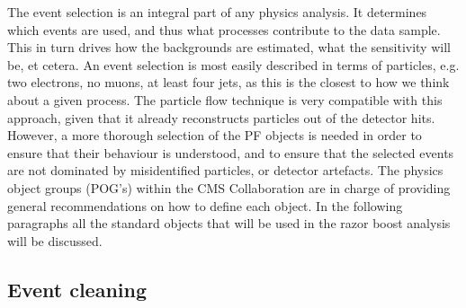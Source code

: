 The event selection is an integral part of any physics analysis. It determines which events are
used, and thus what processes contribute to the data sample. This in turn drives how the
backgrounds are estimated, what the sensitivity will be, et cetera. 
An event selection is most easily described in terms of particles, e.g. two electrons, no muons, at
least four jets, as this is the closest to how we think about a given process.  
The particle flow technique is very compatible with this approach, given that it already
reconstructs particles out of the detector hits. 
However, a more thorough selection of the PF objects is needed in order to ensure that their
behaviour is understood, and to ensure that the selected events are not dominated by
misidentified particles, or detector artefacts. 
The physics object groups (POG's) within the CMS Collaboration are in charge of providing general
recommendations on how to define each object. 
In the following paragraphs all the standard objects that will be used in the razor boost analysis
will be discussed.

% 






\subsection{Event cleaning \label{sec:event_cleaning}}

